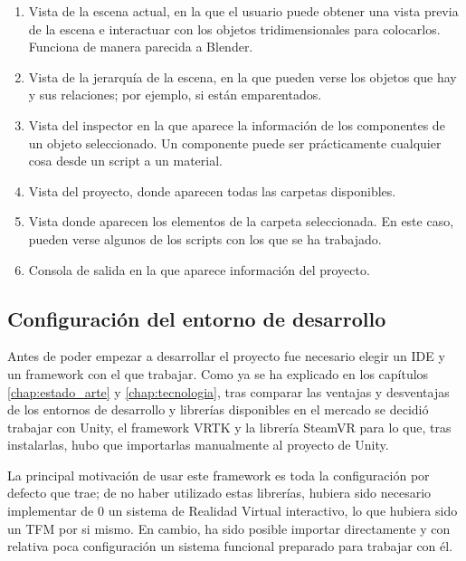 \begin{enumerate}
    \item Vista de la escena actual, en la que el usuario puede obtener una vista previa de la escena e interactuar con los objetos tridimensionales para colocarlos. Funciona de manera parecida a Blender.
    
    \item Vista de la jerarquía de la escena, en la que pueden verse los objetos que hay y sus relaciones; por ejemplo, si están emparentados.
    
    \item Vista del inspector en la que aparece la información de los componentes de un objeto seleccionado. Un componente puede ser prácticamente cualquier cosa desde un script a un material.
    
    \item Vista del proyecto, donde aparecen todas las carpetas disponibles.
    
    \item Vista donde aparecen los elementos de la carpeta seleccionada. En este caso, pueden verse algunos de los scripts con los que se ha trabajado.
    
    \item Consola de salida en la que aparece información del proyecto.
\end{enumerate}

\subsection{Configuración del entorno de desarrollo}

Antes de poder empezar a desarrollar el proyecto fue necesario elegir un \acs{IDE} y un framework con el que trabajar. Como ya se ha explicado en los capítulos \ref{chap:estado_arte} y \ref{chap:tecnologia}, tras comparar las ventajas y desventajas de los entornos de desarrollo y librerías disponibles en el mercado se decidió trabajar con Unity, el framework \acs{VRTK} y la librería SteamVR para lo que, tras instalarlas, hubo que importarlas manualmente al proyecto de Unity.

La principal motivación de usar este framework es toda la configuración por defecto que trae; de no haber utilizado estas librerías, hubiera sido necesario implementar de 0 un sistema de Realidad Virtual interactivo, lo que hubiera sido un \acs{TFM} por si mismo. En cambio, ha sido posible importar directamente y con relativa poca configuración un sistema funcional preparado para trabajar con él.

